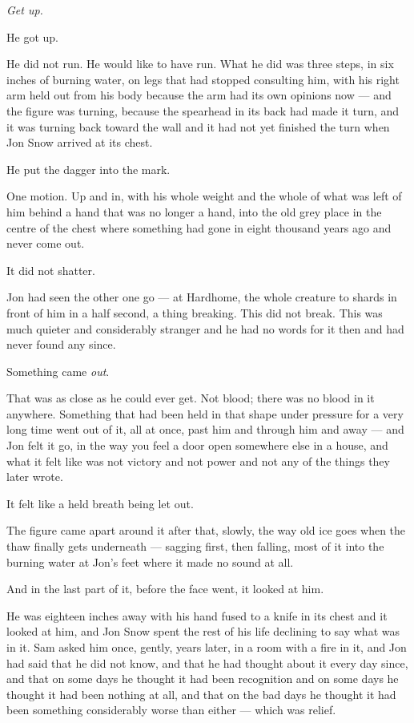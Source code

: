 \textit{Get up.}

He got up.

He did not run. He would like to have run. What he did was three steps, in six inches of burning water, on legs that had stopped consulting him, with his right arm held out from his body because the arm had its own opinions now — and the figure was turning, because the spearhead in its back had made it turn, and it was turning back toward the wall and it had not yet finished the turn when Jon Snow arrived at its chest.

He put the dagger into the mark.

One motion. Up and in, with his whole weight and the whole of what was left of him behind a hand that was no longer a hand, into the old grey place in the centre of the chest where something had gone in eight thousand years ago and never come out.

\sceneBreak

It did not shatter.

Jon had seen the other one go — at Hardhome, the whole creature to shards in front of him in a half second, a thing breaking. This did not break. This was much quieter and considerably stranger and he had no words for it then and had never found any since.

Something came \textit{out}.

That was as close as he could ever get. Not blood; there was no blood in it anywhere. Something that had been held in that shape under pressure for a very long time went out of it, all at once, past him and through him and away — and Jon felt it go, in the way you feel a door open somewhere else in a house, and what it felt like was not victory and not power and not any of the things they later wrote.

It felt like a held breath being let out.

The figure came apart around it after that, slowly, the way old ice goes when the thaw finally gets underneath — sagging first, then falling, most of it into the burning water at Jon’s feet where it made no sound at all.

And in the last part of it, before the face went, it looked at him.

He was eighteen inches away with his hand fused to a knife in its chest and it looked at him, and Jon Snow spent the rest of his life declining to say what was in it. Sam asked him once, gently, years later, in a room with a fire in it, and Jon had said that he did not know, and that he had thought about it every day since, and that on some days he thought it had been recognition and on some days he thought it had been nothing at all, and that on the bad days he thought it had been something considerably worse than either — which was relief.


